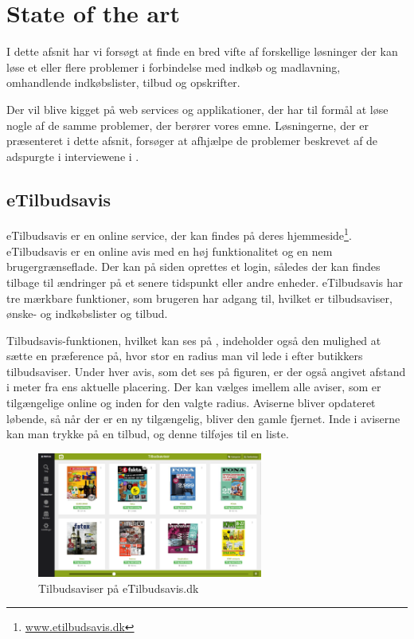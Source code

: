\section{State of the art}\label{s:SOTA}
I dette afsnit har vi forsøgt at finde en bred vifte af forskellige løsninger der kan løse et eller flere problemer i forbindelse med indkøb og madlavning, omhandlende indkøbslister, tilbud og opskrifter.

Der vil blive kigget på web services og applikationer, der har til formål at løse nogle af de samme problemer, der berører vores emne.
Løsningerne, der er præsenteret i dette afsnit, forsøger at afhjælpe de problemer beskrevet af de adspurgte i interviewene i .

\subsection{eTilbudsavis}
eTilbudsavis er en online service, der kan findes på deres hjemmeside\footnote{\underline{www.etilbudsavis.dk}}. eTilbudsavis er en online avis med en høj funktionalitet og en nem brugergrænseflade.
Der kan på siden oprettes et login, således der kan findes tilbage til ændringer på et senere tidspunkt eller andre enheder.
eTilbudsavis har tre mærkbare funktioner, som brugeren har adgang til, hvilket er tilbudsaviser, ønske- og indkøbslister og tilbud.

Tilbudsavis-funktionen, hvilket kan ses på , indeholder også den mulighed at sætte en præference på, hvor stor en radius man vil lede i efter butikkers tilbudsaviser.
Under hver avis, som det ses på figuren, er der også angivet afstand i meter fra ens aktuelle placering.
Der kan vælges imellem alle aviser, som er tilgængelige online og inden for den valgte radius.
Aviserne bliver opdateret løbende, så når der er en ny tilgængelig, bliver den gamle fjernet.
Inde i aviserne kan man trykke på en tilbud, og denne tilføjes til en liste.

\begin{figure}
\vspace{-20pt}
	\begin{center}
		\includegraphics[width=0.66\textwidth]{images/Images/eTilbudsavis.PNG}
	\end{center}
	\vspace{-20pt}
	\caption{Tilbudsaviser på eTilbudsavis.dk}\label{ss:eTilbudsavis}
	\vspace{-20pt}
\end{figure}

